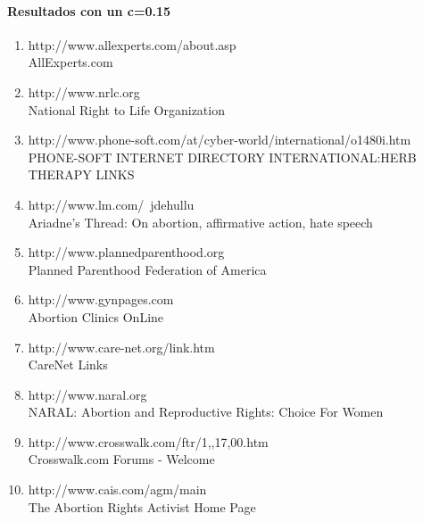 \paragraph{Resultados con un c=0.15}
\begin{enumerate}
\item
http://www.allexperts.com/about.asp\\
AllExperts.com
\item
http://www.nrlc.org\\
National Right to Life Organization
\item
http://www.phone-soft.com/at/cyber-world/international/o1480i.htm\\
PHONE-SOFT INTERNET DIRECTORY INTERNATIONAL:HERB THERAPY LINKS
\item

http://www.lm.com/~jdehullu\\
Ariadne's Thread: On abortion, affirmative action, hate speech
\item


http://www.plannedparenthood.org\\
Planned Parenthood Federation of America
\item

http://www.gynpages.com\\
Abortion Clinics OnLine
\item

http://www.care-net.org/link.htm\\
CareNet Links
\item

http://www.naral.org\\
NARAL: Abortion and Reproductive Rights: Choice For Women
 \item

http://www.crosswalk.com/ftr/1,,17,00.htm \\
Crosswalk.com Forums - Welcome
 \item

http://www.cais.com/agm/main\\
The Abortion Rights Activist Home Page

\end{enumerate}

